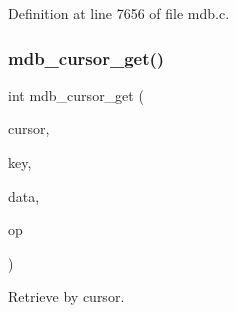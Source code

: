Definition at line 7656 of file mdb.\+c.

\mbox{\label{group__mdb_ga48df35fb102536b32dfbb801a47b4cb0}} 
\subsubsection{\texorpdfstring{mdb\+\_\+cursor\+\_\+get()}{mdb\_cursor\_get()}}
{\footnotesize\ttfamily int mdb\+\_\+cursor\+\_\+get (\begin{DoxyParamCaption}\item[{\mbox{\hyperlink{struct_m_d_b__cursor}{M\+D\+B\+\_\+cursor}} $\ast$}]{cursor,  }\item[{\mbox{\hyperlink{struct_m_d_b__val}{M\+D\+B\+\_\+val}} $\ast$}]{key,  }\item[{\mbox{\hyperlink{struct_m_d_b__val}{M\+D\+B\+\_\+val}} $\ast$}]{data,  }\item[{\mbox{\hyperlink{group__mdb_ga1206b2af8b95e7f6b0ef6b28708c9127}{M\+D\+B\+\_\+cursor\+\_\+op}}}]{op }\end{DoxyParamCaption})}



Retrieve by cursor. 

